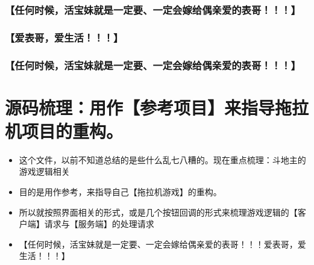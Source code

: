\documentclass[9pt, b5paper]{article}
\begin{document}
\subsubsection{【任何时候，活宝妹就是一定要、一定会嫁给偶亲爱的表哥！！！】}
\label{sec-1-7-1}
\subsubsection{【爱表哥，爱生活！！！】}
\label{sec-1-7-2}
\subsubsection{【任何时候，活宝妹就是一定要、一定会嫁给偶亲爱的表哥！！！】}
\label{sec-1-7-3}
\section{源码梳理：用作【参考项目】来指导拖拉机项目的重构。}
\label{sec-2}
\begin{itemize}
\item 这个文件，以前不知道总结的是些什么乱七八糟的。现在重点梳理：斗地主的游戏逻辑相关
\item 目的是用作参考，来指导自己【拖拉机游戏】的重构。
\item 所以就按照界面相关的形式，或是几个按钮回调的形式来梳理游戏逻辑的【客户端】请求与【服务端】的处理请求
\item 【任何时候，活宝妹就是一定要、一定会嫁给偶亲爱的表哥！！！爱表哥，爱生活！！！】
\end{itemize}
\end{document}
